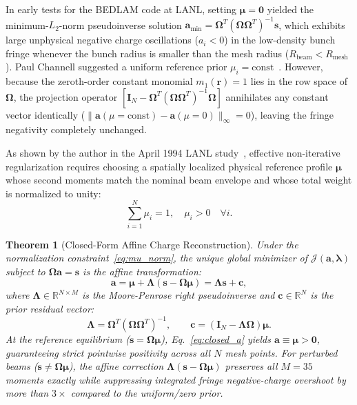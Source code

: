 \documentclass[11pt,a4paper]{article}
\newcommand{\bOmega}{\mathbf{\Omega}}
\newcommand{\bLambda}{\mathbf{\Lambda}}
\newtheorem{theorem}{Theorem}
\begin{document}
In early tests for the BEDLAM code at LANL, setting $\bm{\mu} = \bm{0}$ yielded the minimum-$L_2$-norm pseudoinverse solution $\bm{a}_{\min} = \bOmega^T (\bOmega\bOmega^T)^{-1} \bm{s}$, which exhibits large unphysical negative charge oscillations ($a_i < 0$) in the low-density bunch fringe whenever the bunch radius is smaller than the mesh radius ($R_{\mathrm{beam}} < R_{\mathrm{mesh}}$). Paul Channell suggested a uniform reference prior $\mu_i = \mathrm{const}$~\cite{channell1993moment}. However, because the zeroth-order constant monomial $m_1(\bm{r}) = 1$ lies in the row space of $\bOmega$, the projection operator $[\bm{I}_N - \bOmega^T(\bOmega\bOmega^T)^{-1}\bOmega]$ annihilates any constant vector identically ($\|\bm{a}(\mu=\mathrm{const}) - \bm{a}(\mu=0)\|_\infty = 0$), leaving the fringe negativity completely unchanged.

As shown by the author in the April 1994 LANL study~\cite{ahn1994preliminary}, effective non-iterative regularization requires choosing a spatially localized physical reference profile $\bm{\mu}$ whose second moments match the nominal beam envelope and whose total weight is normalized to unity:
\begin{equation}
    \sum_{i=1}^N \mu_i = 1, \quad \mu_i > 0 \quad \forall i.
    \label{eq:mu_norm}
\end{equation}

\begin{theorem}[Closed-Form Affine Charge Reconstruction]
\label{thm:charge_inversion}
Under the normalization constraint~\eqref{eq:mu_norm}, the unique global minimizer of $\mathcal{J}(\bm{a}, \bm{\lambda})$ subject to $\bOmega\bm{a} = \bm{s}$ is the affine transformation:
\begin{equation}
    \bm{a} = \bm{\mu} + \bLambda (\bm{s} - \bOmega \bm{\mu}) = \bLambda \bm{s} + \bm{c},
    \label{eq:closed_a}
\end{equation}
where $\bLambda \in \mathbb{R}^{N \times M}$ is the Moore-Penrose right pseudoinverse and $\bm{c} \in \mathbb{R}^N$ is the prior residual vector:
\begin{equation}
    \bLambda = \bOmega^T (\bOmega \bOmega^T)^{-1}, \qquad \bm{c} = (\bm{I}_N - \bLambda \bOmega)\bm{\mu}.
    \label{eq:lambda_matrix}
\end{equation}
At the reference equilibrium ($\bm{s} = \bOmega \bm{\mu}$), Eq.~\eqref{eq:closed_a} yields $\bm{a} \equiv \bm{\mu} > \bm{0}$, guaranteeing strict pointwise positivity across all $N$ mesh points. For perturbed beams ($\bm{s} \ne \bOmega\bm{\mu}$), the affine correction $\bLambda(\bm{s} - \bOmega\bm{\mu})$ preserves all $M=35$ moments exactly while suppressing integrated fringe negative-charge overshoot by more than $3\times$ compared to the uniform/zero prior.
\end{theorem}
\end{document}
